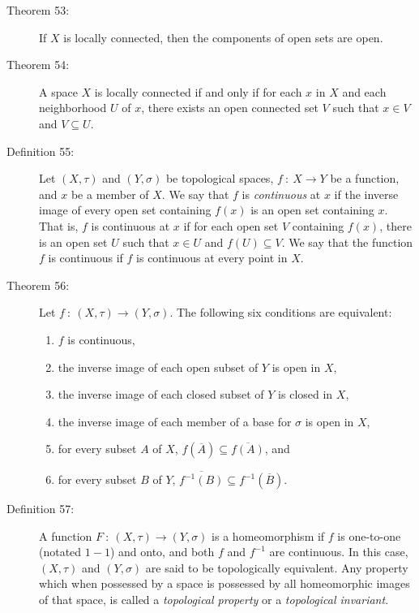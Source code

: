 \documentclass{article}
\begin{document}
\begin{description}
  \item[Theorem 53:] If $X$ is locally connected, then the components of open sets are open.

  \item[Theorem 54:] A space $X$ is locally connected if and only if for each $x$ in $X$ and each neighborhood $U$ of $x$, there exists an open connected set $V$ such that $x \in V$ and $V \subseteq U$.

  \item[Definition 55:] Let $(X,\tau)$ and $(Y,\sigma)$ be topological spaces, $f \ : \ X \rightarrow Y$ be a function, and $x$ be a member of $X$. We say that $f$ is \emph{continuous} at $x$ if the inverse image of every open set containing $f(x)$ is an open set containing $x$. That is, $f$ is continuous at $x$ if for each open set $V$ containing $f(x)$, there is an open set $U$ such that $x \in U$ and $f(U) \subseteq V$. We say that the function $f$ is continuous if $f$ is continuous at every point in $X$.

  \item[Theorem 56:] Let $f \ : \ (X,\tau) \rightarrow (Y,\sigma)$. The following six conditions are equivalent:
    \begin{enumerate}[\hspace{1cm}1.]
      \item $f$ is continuous,
      \item the inverse image of each open subset of $Y$ is open in $X$,
      \item the inverse image of each closed subset of $Y$ is closed in $X$,
      \item the inverse image of each member of a base for $\sigma$ is open in $X$,
      \item for every subset $A$ of $X$, $f(\overline{A}) \subseteq \overline{f(A)}$, and
      \item for every subset $B$ of $Y$, $\overline{f^{-1}(B)} \subseteq f^{-1}(\overline{B})$.
    \end{enumerate}

  \item[Definition 57:] A function $F \ : \ (X,\tau) \rightarrow (Y,\sigma)$ is a homeomorphism if $f$ is one-to-one (notated $1-1$) and onto, and both $f$ and $f^{-1}$ are continuous. In this case, $(X,\tau)$ and $(Y,\sigma)$ are said to be topologically equivalent. Any property which when possessed by a space is possessed by all homeomorphic images of that space, is called a \emph{topological property} or a \emph{topological invariant}.


\end{description}
\end{document}
